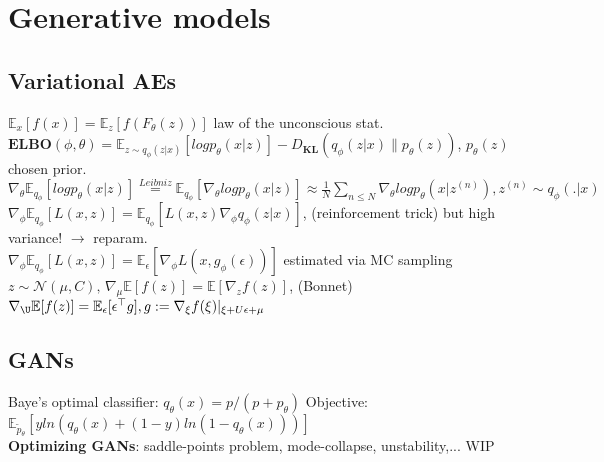 \section{Generative models}
\subsection*{Variational AEs}
$\mathbb{E}_x[f(x)]=\mathbb{E}_z[f(F_\theta(z))]$ law of the unconscious stat. \\
$\textbf{ELBO}(\phi, \theta)=\mathbb{E}_{z\sim q_\phi(z\vert x)}[log p_\theta (x\vert z)] - D_{\textbf{KL}}(q_\phi (z \vert x) \| p_\theta (z))$, $p_\theta (z)$ chosen prior. \\
$\nabla_\theta \mathbb{E}_{q_\phi}[log p_\theta (x\vert z)] \stackrel{\textit{Leibniz}}{=}  \mathbb{E}_{q_\phi}[\nabla_\theta log p_\theta (x\vert z)] \approx \frac{1}{N}\sum_{n\leq N} \nabla_\theta log p_\theta (x\vert z^{(n)}), z^{(n)} \sim q_\phi(.\vert x)$ \\
$\nabla_\phi \mathbb{E}_{q_\phi}[L(x,z)] =  \mathbb{E}_{q_\phi}[L(x,z)\nabla_\phi q_\phi(z\vert x)]$, (reinforcement trick) but high variance! $\rightarrow$ reparam.\\
$\nabla_\phi \mathbb{E}_{q_\phi}[L(x,z)] =  \mathbb{E}_{\epsilon}[\nabla_\phi L(x, g_\phi(\epsilon))]$ estimated via MC sampling \\
$z\sim \mathcal{N}(\mu, C),\, \nabla_\mu \mathbb{E}[f(z)] = \mathbb{E}[\nabla_z f(z)]$, (Bonnet)\\
$\nabla_\U \mathbb{E}[f(z)] = \mathbb{E}_\epsilon[\epsilon^\top g], g := \nabla_\xi f(\xi) \vert_{\xi + U\epsilon + \mu} $

\subsection*{GANs}
Baye's optimal classifier: $q_\theta(x) = p / (p + p_\theta)$ 
Objective: $\mathbb{E}_{\tilde p_\theta}[y ln(q_\theta(x) + (1-y)ln(1-q_\theta(x)))]$ \\
\textbf{Optimizing GANs}: saddle-points problem, mode-collapse, unstability,... WIP
